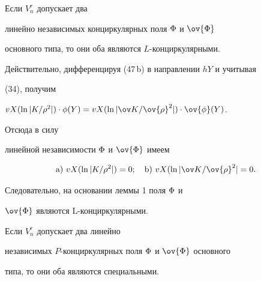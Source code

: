 \begin{thm}


Если $V^r_n$ допускает два


линейно независимых конциркулярных поля $\Phi$ и $\ov{\F}$


основного типа, то они оба являются $L$-конциркулярными.


\end{thm}





\begin{pf}


Действительно, дифференцируя (47\,b) в направлении $hY$ и учитывая


(34), получим


${vX}(\ln{| {K}/{\rho }^2|})\cdot\f(Y)={vX}(\ln{|


{\ov K}/{\ov{\rho}^2 }|})\cdot\ov{\f}(Y)$.


Отсюда в силу


линейной независимости $\Phi$ и $\ov{\F}$ имеем


$$


\mathrm a)\ {vX}(\ln{| {K}/{\rho }^2|})=0;\quad


\mathrm b)\ {vX}(\ln{| {\ov K}/{\ov{\rho}^2 }|}=0.


$$


Следовательно, на основании леммы 1 поля $\Phi$ и


$\ov {\F}$ являются L-конциркулярными.


\end{pf}





\begin{thm}


Если $V^r_n$ допускает два линейно


независимых $P$-конциркулярных поля $\Phi$ и $\ov{\F}$ основного


типа, то они оба являются специальными.


\end{thm}





